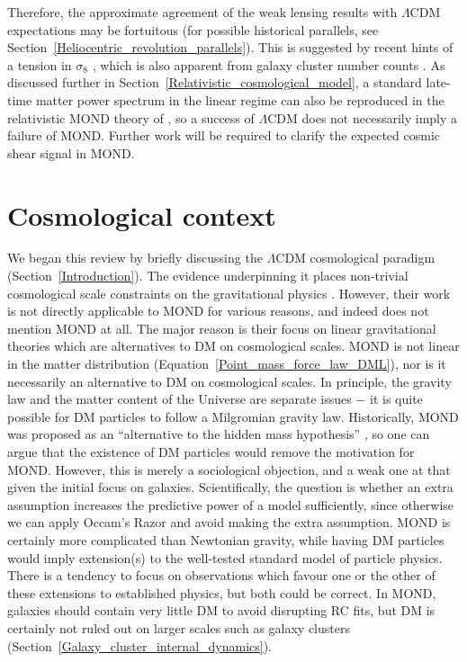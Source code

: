\documentclass[fleqn,usenatbib,useAMS]{mnras} %
\begin{document}
Therefore, the approximate agreement of the weak lensing results with $\Lambda$CDM expectations may be fortuitous (for possible historical parallels, see Section~\ref{Heliocentric_revolution_parallels}). This is suggested by recent hints of a tension in $\sigma_8$ \citep{Asgari_2021, Heymans_2021, Secco_2022}, which is also apparent from galaxy cluster number counts \citep{Schrabback_2021_calibration}. As discussed further in Section~\ref{Relativistic_cosmological_model}, a standard late-time matter power spectrum in the linear regime can also be reproduced in the relativistic MOND theory of \citet{Skordis_2021}, so a success of $\Lambda$CDM does not necessarily imply a failure of MOND. Further work will be required to clarify the expected cosmic shear signal in MOND.





\section{Cosmological context}
\label{Cosmological_context}

We began this review by briefly discussing the $\Lambda$CDM cosmological paradigm (Section~\ref{Introduction}). The evidence underpinning it places non-trivial cosmological scale constraints on the gravitational physics \citep{Pardo_2020}. However, their work is not directly applicable to MOND for various reasons, and indeed does not mention MOND at all. The major reason is their focus on linear gravitational theories which are alternatives to DM on cosmological scales. MOND is not linear in the matter distribution (Equation~\ref{Point_mass_force_law_DML}), nor is it necessarily an alternative to DM on cosmological scales. In principle, the gravity law and the matter content of the Universe are separate issues $-$ it is quite possible for DM particles to follow a Milgromian gravity law. Historically, MOND was proposed as an ``alternative to the hidden mass hypothesis'' \citep{Milgrom_1983}, so one can argue that the existence of DM particles would remove the motivation for MOND. However, this is merely a sociological objection, and a weak one at that given the initial focus on galaxies. Scientifically, the question is whether an extra assumption increases the predictive power of a model sufficiently, since otherwise we can apply Occam's Razor and avoid making the extra assumption. MOND is certainly more complicated than Newtonian gravity, while having DM particles would imply extension(s) to the well-tested standard model of particle physics. There is a tendency to focus on observations which favour one or the other of these extensions to established physics, but both could be correct. In MOND, galaxies should contain very little DM to avoid disrupting RC fits, but DM is certainly not ruled out on larger scales such as galaxy clusters (Section~\ref{Galaxy_cluster_internal_dynamics}).
\end{document}
